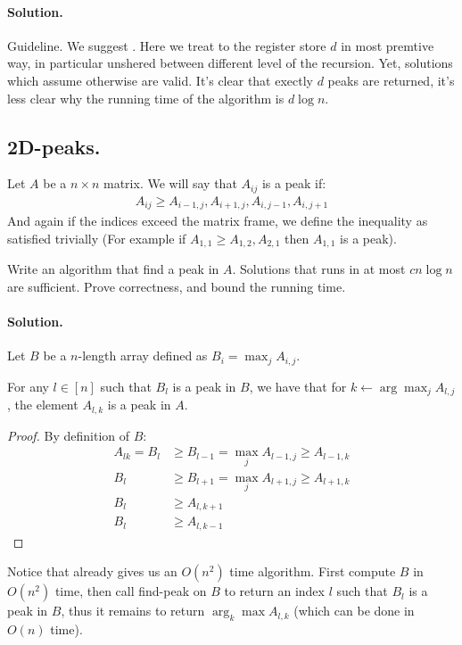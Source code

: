 \paragraph{Solution.} Guideline. We suggest . Here we treat to the register store $d$ in most premtive way, in particular unshered between different level of the recursion. Yet, solutions which assume otherwise are valid. It's clear that exectly $d$ peaks are returned, it's less clear why the running time of the algorithm is $d\log n$. 
\fi
\fi

  
\subsection{2D-peaks.} Let $A$ be a $n\times n$ matrix. We will say that $A_{ij}$ is a peak if: 
\begin{equation*}
  \begin{split}
    A_{ij} \ge A_{i-1,j}, A_{i+1,j}, A_{i,j-1}, A_{i,j+1}
  \end{split}
\end{equation*} 
And again if the indices exceed the matrix frame, we define the inequality as satisfied trivially (For example if $A_{1,1} \ge A_{1,2}, A_{2,1}$ then $A_{1,1}$ is a peak).

Write an algorithm that find a peak in $A$. Solutions that runs in at most $c n\log n $ are sufficient. Prove correctness, and bound the running time. 

\ifdefined\SOLUTION
  \newpage
  \paragraph{Solution.} Let $B$ be a $n$-length array defined as $B_{i} = \max_{j}{A_{i,j}}$.
  \begin{claim}
    \label{claim:maxA}
    For any $l \in [n]$ such that $B_l$ is a peak in $B$, we have that for $k \leftarrow \arg \max_{j} A_{l,j}$, the element $A_{l,k}$ is a peak in $A$.
\end{claim}

\begin{proof}
By definition of $B$:
  \begin{equation*}
    \begin{split}
      A_{lk} = B_{l} & \ge B_{l-1} = \max_{j}{A_{l-1,j}} \ge A_{l-1,k}\\
               B_{l} & \ge  B_{l+1} = \max_{j}{A_{l+1,j}}  \ge A_{l+1,k}\\
               B_{l} & \ge A_{l,k+1}\\
               B_{l} & \ge A_{l,k-1} 
    \end{split}
  \end{equation*}
\end{proof}
Notice that  already gives us an $O(n^2)$ time algorithm. First compute $B$ in $O(n^2)$ time, then call find-peak on $B$ to return an index $l$ such that $B_l$ is a peak in $B$, thus it remains to return $\arg_k \max A_{l,k}$ (which can be done in $O(n)$ time). 



